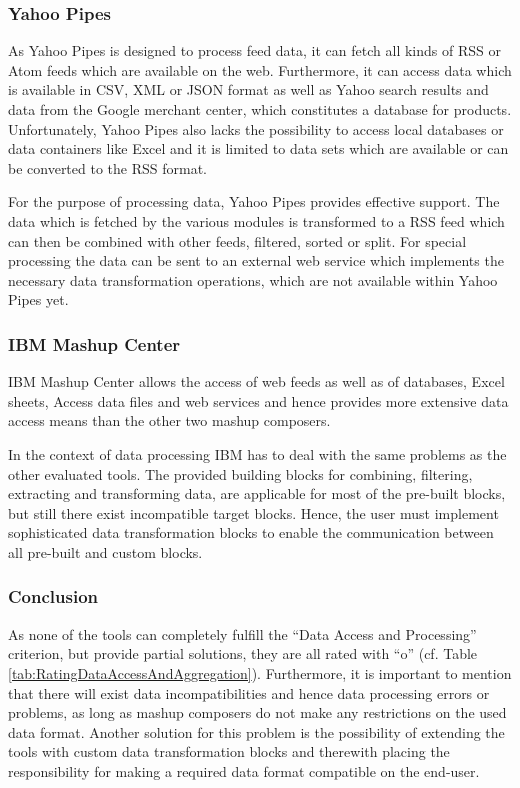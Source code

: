 \subsubsection{Yahoo Pipes}
As Yahoo Pipes is designed to process feed data, it can fetch all kinds of RSS or Atom feeds which
are available on the web. Furthermore, it can access data which is available in CSV, XML or JSON
format as well as Yahoo search results and data from the Google merchant center, which constitutes
a database for products. Unfortunately, Yahoo Pipes also lacks the possibility to access
local databases or data containers like Excel and it is limited to data sets which are available or
can be converted to the RSS format.

For the purpose of processing data, Yahoo Pipes provides effective support. The data which is
fetched by the various modules is transformed to a RSS feed which can then be combined with other
feeds, filtered, sorted or split. For special processing the data can be sent to an external web
service which implements the necessary data transformation operations, which are not available
within Yahoo Pipes yet.

\subsubsection{IBM Mashup Center}
IBM Mashup Center allows the access of web feeds as well as of databases, Excel sheets, Access data
files and web services and hence provides more extensive data access means than the other two mashup
composers.

In the context of data processing IBM has to deal with the same problems as the other evaluated
tools. The provided building blocks for combining, filtering, extracting and transforming data, are
applicable for most of the pre-built blocks, but still there exist incompatible target blocks.
Hence, the user must implement sophisticated data transformation blocks to enable the communication
between all pre-built and custom blocks.

\subsubsection{Conclusion}

As none of the tools can completely fulfill the ``Data Access and Processing'' criterion, but
provide partial solutions, they are all rated with ``o'' (cf. Table
\ref{tab:RatingDataAccessAndAggregation}). Furthermore, it is important to mention that there will
exist data incompatibilities and hence data processing errors or problems, as long as mashup
composers do not make any restrictions on the used data format. Another solution for this problem is
the possibility of extending the tools with custom data transformation blocks and therewith placing
the responsibility for making a required data format compatible on the end-user.

